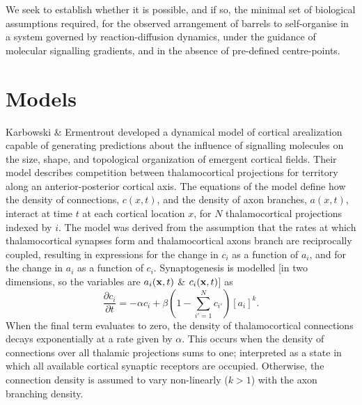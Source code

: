 \documentclass[9pt,twocolumn,twoside,lineno]{pnas-new}
\begin{document}
We seek to establish whether it is possible, and if so, the minimal set of
biological assumptions required, for the observed arrangement of barrels to
self-organise in a system governed by reaction-diffusion dynamics, under the
guidance of molecular signalling gradients, and in the absence of pre-defined
centre-points.

\section*{Models}

Karbowski \& Ermentrout \citep{karbowski_model_2004} developed a dynamical
model of cortical arealization capable of generating predictions about the
influence of signalling molecules on the size, shape, and topological
organization of emergent cortical fields. Their model describes competition
between thalamocortical projections for territory along an anterior-posterior
cortical axis. The equations of the model define how the density of
connections, $c(x,t)$, and the density of axon branches, $a(x,t)$, interact at time $t$
at each cortical location $x$, for $N$ thalamocortical projections indexed by
$i$.
%
The model was derived from the assumption that the rates at which
thalamocortical synapses form and thalamocortical axons branch are
reciprocally coupled, resulting in expressions for the change in $c_i$ as a
function of $a_i$, and for the change in $a_i$ as a function of
$c_i$. Synaptogenesis is modelled [in two dimensions, so the variables are
$a_i(\mathbf{x},t)$ \& $c_i(\mathbf{x},t)$] as
%
\begin{equation} \label{eq:dc}
\frac{\partial c_i}{\partial t} =-\alpha c_i +\beta  \left(1 - \sum_{i'=1}^{N} c_{i'}\right)[a_i]^k.
\end{equation}
%
When the final term evaluates to zero, the density of thalamocortical
connections decays exponentially at a rate given by $\alpha$. This occurs when
the density of connections over all thalamic projections sums to one;
interpreted as a state in which all available cortical synaptic receptors are
occupied. Otherwise, the connection density is assumed to vary non-linearly
($k>1$) with the axon branching density.
\end{document}
